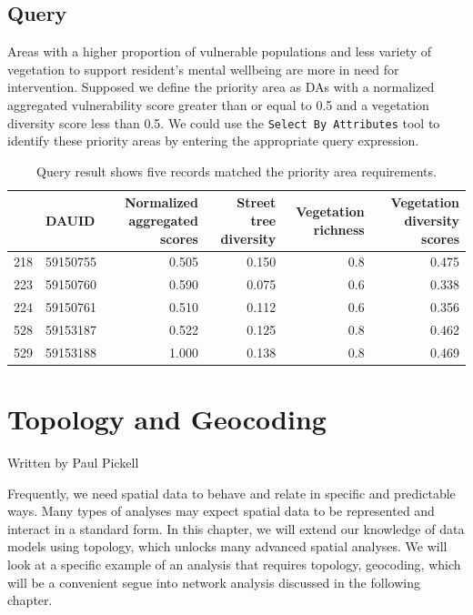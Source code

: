 \documentclass[
]{book}
\begin{document}
\section{Query}\label{query}

Areas with a higher proportion of vulnerable populations and less variety of vegetation to support resident's mental wellbeing are more in need for intervention. Supposed we define the priority area as DAs with a normalized aggregated vulnerability score greater than or equal to 0.5 and a vegetation diversity score less than 0.5. We could use the \texttt{Select\ By\ Attributes} tool to identify these priority areas by entering the appropriate query expression.

\begin{table}

\caption{\label{tab:5-case-study-9}Query result shows five records matched the priority area requirements.}
\centering
\begin{tabular}[t]{llrrrr}
\toprule
  & DAUID & Normalized aggregated scores & Street tree diversity & Vegetation richness & Vegetation diversity scores\\
\midrule
218 & 59150755 & 0.505 & 0.150 & 0.8 & 0.475\\
223 & 59150760 & 0.590 & 0.075 & 0.6 & 0.338\\
224 & 59150761 & 0.510 & 0.112 & 0.6 & 0.356\\
528 & 59153187 & 0.522 & 0.125 & 0.8 & 0.462\\
529 & 59153188 & 1.000 & 0.138 & 0.8 & 0.469\\
\bottomrule
\end{tabular}
\end{table}

\chapter{Topology and Geocoding}\label{topology}

Written by
Paul Pickell

Frequently, we need spatial data to behave and relate in specific and predictable ways. Many types of analyses may expect spatial data to be represented and interact in a standard form. In this chapter, we will extend our knowledge of data models using topology, which unlocks many advanced spatial analyses. We will look at a specific example of an analysis that requires topology, geocoding, which will be a convenient segue into network analysis discussed in the following chapter.
\end{document}
